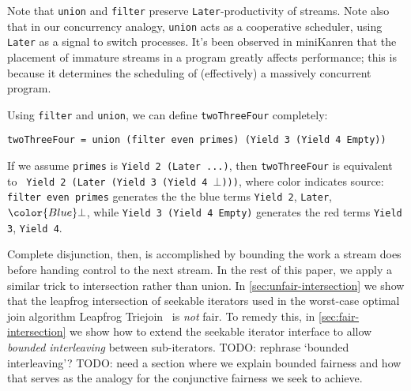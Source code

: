 \documentclass[acmsmall,screen,dvipsnames,svgnames]{acmart}
\newcommand\hask[1]{\texttt{#1}}
\newcommand\ttt\texttt
\newcommand\todo[1]{{\color{Orange}#1}}
\renewcommand\todo[1]{{\color{IndianRed}#1}}
\newcommand\oldtodo[1]{\todo{#1}}
\begin{document}
\noindent
Note that \ttt{union} and \ttt{filter} preserve \hask{Later}-productivity of streams.
Note also that in our concurrency analogy, \ttt{union} acts as a cooperative scheduler, using \hask{Later} as a signal to switch processes.
It's been observed in miniKanren that the placement of immature streams in a program greatly affects performance; this is because it determines the scheduling of (effectively) a massively concurrent program.

Using \ttt{filter} and \ttt{union}, we can define \ttt{twoThreeFour} completely:

\begin{verbatim}
twoThreeFour = union (filter even primes) (Yield 3 (Yield 4 Empty))
\end{verbatim}

\noindent
If we assume \ttt{primes} is \ttt{Yield 2 (Later ...)}, then \ttt{twoThreeFour} is equivalent to \ttt{\color{Blue} Yield 2 (Later {\color{Red}(Yield 3 (Yield 4 {\color{Blue}$\bot$}))})}, where color indicates source: \ttt{filter even primes} generates the the blue terms \ttt{\color{Blue}Yield 2}, \ttt{\color{Blue}Later}, $\color{Blue}\bot$, while \ttt{Yield 3 (Yield 4 Empty)} generates the red terms \ttt{\color{Red}Yield 3}, \ttt{\color{Red}Yield 4}.

Complete disjunction, then, is accomplished by bounding the work a stream does before handing control to the next stream.
In the rest of this paper, we apply a similar trick to intersection rather than union.
In \cref{sec:unfair-intersection} we show that the leapfrog intersection of seekable iterators used in the worst-case optimal join algorithm Leapfrog Triejoin~\citep{lftj} is \emph{not} fair.
To remedy this, in \cref{sec:fair-intersection} we show how to extend the seekable iterator interface to allow \emph{bounded interleaving} between sub-iterators.
\oldtodo{TODO: rephrase `bounded interleaving'?}
\todo{TODO: need a section where we explain bounded fairness and how that serves as the analogy for the conjunctive fairness we seek to achieve.}



\end{document}
